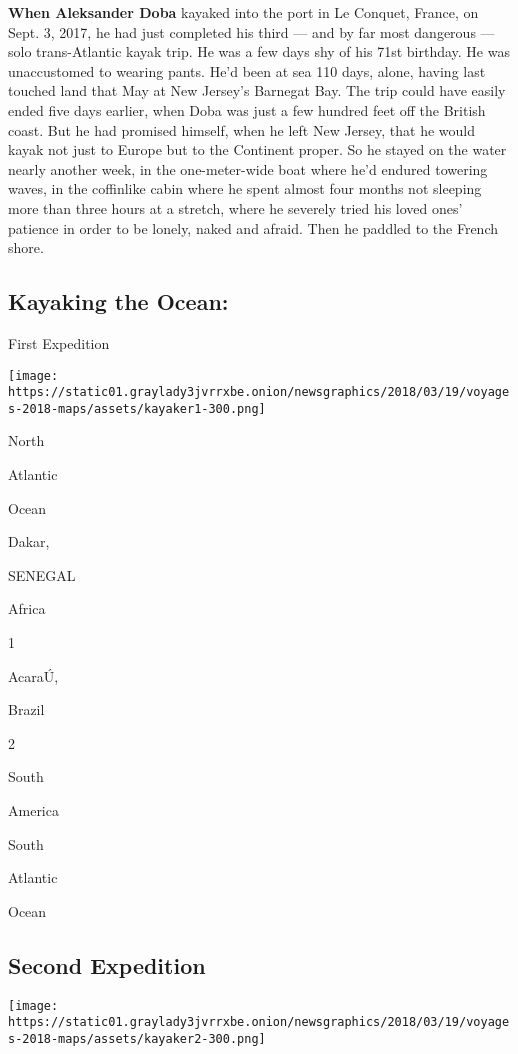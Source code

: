 \textbf{When Aleksander Doba} kayaked into the port in Le Conquet,
France, on Sept. 3, 2017, he had just completed his third --- and by far
most dangerous --- solo trans-Atlantic kayak trip. He was a few days shy
of his 71st birthday. He was unaccustomed to wearing pants. He'd been at
sea 110 days, alone, having last touched land that May at New Jersey's
Barnegat Bay. The trip could have easily ended five days earlier, when
Doba was just a few hundred feet off the British coast. But he had
promised himself, when he left New Jersey, that he would kayak not just
to Europe but to the Continent proper. So he stayed on the water nearly
another week, in the one-meter-wide boat where he'd endured towering
waves, in the coffinlike cabin where he spent almost four months not
sleeping more than three hours at a stretch, where he severely tried his
loved ones' patience in order to be lonely, naked and afraid. Then he
paddled to the French shore.

\hypertarget{kayaking-the-ocean}{%
\subsection{Kayaking the Ocean:}\label{kayaking-the-ocean}}

First Expedition

\texttt{[image: https://static01.graylady3jvrrxbe.onion/newsgraphics/2018/03/19/voyages-2018-maps/assets/kayaker1-300.png]}

North

Atlantic

Ocean

Dakar,

SENEGAL

Africa

1

AcaraÚ,

Brazil

2

South

America

South

Atlantic

Ocean

\hypertarget{second-expedition}{%
\subsection{Second Expedition}\label{second-expedition}}

\texttt{[image: https://static01.graylady3jvrrxbe.onion/newsgraphics/2018/03/19/voyages-2018-maps/assets/kayaker2-300.png]}


